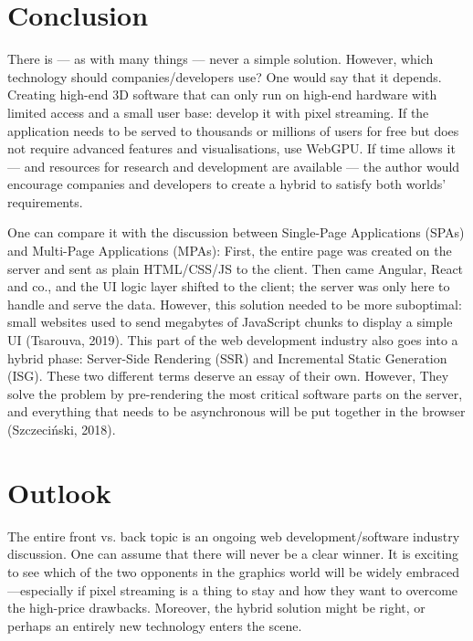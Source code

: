 \documentclass[10pt]{article}
\begin{document}
\begin{sloppypar}
  \section{Conclusion}
  \label{sec:conclusion}

  There is — as with many things — never a simple solution. However, which technology should companies/developers use? One would say that it depends. Creating high-end 3D software that can only run on high-end hardware with limited access and a small user base: develop it with pixel streaming. If the application needs to be served to thousands or millions of users for free but does not require advanced features and visualisations, use WebGPU. If time allows it — and resources for research and development are available — the author would encourage companies and developers to create a hybrid to satisfy both worlds’ requirements.

  One can compare it with the discussion between Single-Page Applications (SPAs) and Multi-Page Applications (MPAs): First, the entire page was created on the server and sent as plain HTML/CSS/JS to the client. Then came Angular, React and co., and the UI logic layer shifted to the client; the server was only here to handle and serve the data. However, this solution needed to be more suboptimal: small websites used to send megabytes of JavaScript chunks to display a simple UI (Tsarouva, 2019). This part of the web development industry also goes into a hybrid phase: Server-Side Rendering (SSR) and Incremental Static Generation (ISG). These two different terms deserve an essay of their own. However, They solve the problem by pre-rendering the most critical software parts on the server, and everything that needs to be asynchronous will be put together in the browser (Szczeciński, 2018).

  \section{Outlook}
  \label{sec:outlook}

  The entire front vs. back topic is an ongoing web development/software industry discussion. One can assume that there will never be a clear winner. It is exciting to see which of the two opponents in the graphics world will be widely embraced—especially if pixel streaming is a thing to stay and how they want to overcome the high-price drawbacks. Moreover, the hybrid solution might be right, or perhaps an entirely new technology enters the scene.


  \pagebreak
  
  

\end{sloppypar}
\end{document}
